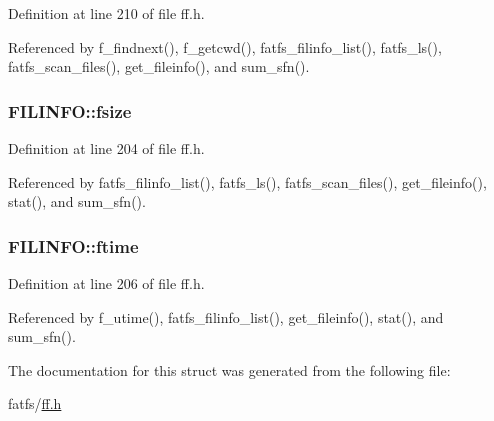 Definition at line 210 of file ff.\+h.



Referenced by f\+\_\+findnext(), f\+\_\+getcwd(), fatfs\+\_\+filinfo\+\_\+list(), fatfs\+\_\+ls(), fatfs\+\_\+scan\+\_\+files(), get\+\_\+fileinfo(), and sum\+\_\+sfn().

\subsubsection[{\texorpdfstring{fsize}{fsize}}]{ F\+I\+L\+I\+N\+F\+O\+::fsize}\hypertarget{structFILINFO_a9e5b78ed7190f73de3ebcbdfbd6d1844}{}\label{structFILINFO_a9e5b78ed7190f73de3ebcbdfbd6d1844}


Definition at line 204 of file ff.\+h.



Referenced by fatfs\+\_\+filinfo\+\_\+list(), fatfs\+\_\+ls(), fatfs\+\_\+scan\+\_\+files(), get\+\_\+fileinfo(), stat(), and sum\+\_\+sfn().

\subsubsection[{\texorpdfstring{ftime}{ftime}}]{ F\+I\+L\+I\+N\+F\+O\+::ftime}\hypertarget{structFILINFO_ae0f751b79621bf7b29669f177bbe6b9a}{}\label{structFILINFO_ae0f751b79621bf7b29669f177bbe6b9a}


Definition at line 206 of file ff.\+h.



Referenced by f\+\_\+utime(), fatfs\+\_\+filinfo\+\_\+list(), get\+\_\+fileinfo(), stat(), and sum\+\_\+sfn().



The documentation for this struct was generated from the following file\+:\begin{DoxyCompactItemize}
\item 
fatfs/\hyperlink{ff_8h}{ff.\+h}\end{DoxyCompactItemize}
